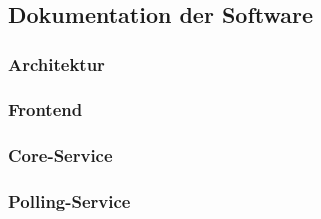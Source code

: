 \setpagestylefoot
\renewcommand{\thefigure}{A\arabic{figure}}
\renewcommand\thelstlisting{A\arabic{lstlisting}}
\renewcommand\thetable{A\arabic{table}}

\appendix
\renewcommand{\thechapter}{\Alph{chapter}}
\renewcommand{\thesection}{\Alph{chapter}.\Alph{section}}
\renewcommand{\thesubsection}{\Alph{chapter}.\Alph{section}.\Alph{subsection}}



\ifliteratur
    \printbibliography[heading=bibintoc,title={Quellen}]
\fi


\chapter{\langanhang}

\section{Dokumentation der Software}
\subsection{Architektur}
\subsection{Frontend}
\subsection{Core-Service}
\subsection{Polling-Service}